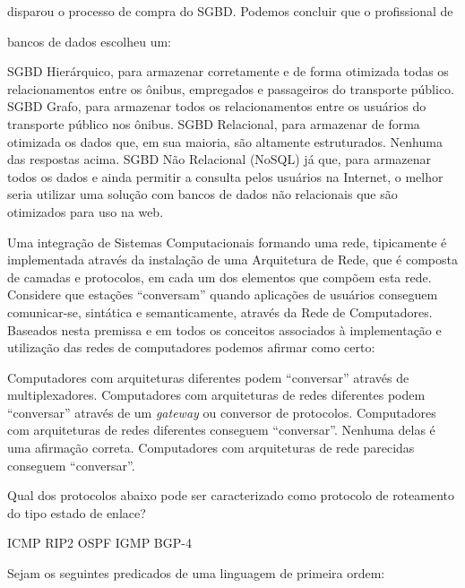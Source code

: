 \documentclass[12pt, addpoints]{exam}
\begin{document}
\begin{questions}
disparou o processo de compra do SGBD. Podemos concluir que o profissional de

bancos de dados escolheu um:
\begin{choices}
\choice SGBD Hierárquico, para armazenar corretamente e de forma otimizada todas os relacionamentos entre os ônibus, empregados e passageiros do transporte público.
\choice SGBD Grafo, para armazenar todos os relacionamentos entre os usuários do transporte público nos ônibus.
\choice SGBD Relacional, para armazenar de forma otimizada os dados que, em sua maioria, são altamente estruturados.
\choice Nenhuma das respostas acima.
\choice SGBD Não Relacional (NoSQL) já que, para armazenar todos os dados e ainda permitir a consulta pelos usuários na Internet, o melhor seria utilizar uma solução com bancos de dados não relacionais que são otimizados para uso na web.
\end{choices}

\question

Uma integração de Sistemas Computacionais formando uma rede, tipicamente é implementada através da instalação de uma Arquitetura de Rede, que é composta de camadas e protocolos, em cada um dos elementos que compõem esta rede. Considere que estações “conversam” quando aplicações de usuários conseguem comunicar-se, sintática e semanticamente, através da Rede de Computadores. Baseados nesta premissa e em todos os conceitos associados à implementação e utilização das redes de computadores podemos afirmar como certo:


\begin{choices}
\choice Computadores com arquiteturas diferentes podem “conversar” através de multiplexadores.
\choice Computadores com arquiteturas de redes diferentes podem “conversar” através de um \textit{gateway} ou conversor de protocolos.
\choice Computadores com arquiteturas de redes diferentes conseguem “conversar”.
\choice Nenhuma delas é uma afirmação correta.
\choice Computadores com arquiteturas de rede parecidas conseguem “conversar”.
\end{choices}

\question

Qual dos protocolos abaixo pode ser caracterizado como protocolo de roteamento do tipo estado de enlace?
\begin{choices}
\choice ICMP
\choice RIP2
\choice OSPF
\choice IGMP
\choice BGP-4
\end{choices}

\question

Sejam os seguintes predicados de uma linguagem de primeira ordem:




\end{questions}
\end{document}
